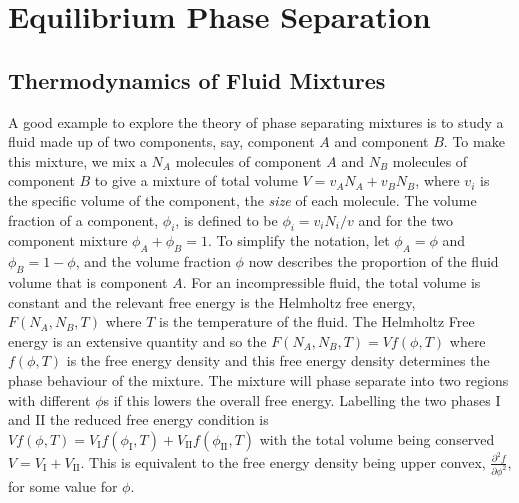\section{Equilibrium Phase Separation}

\subsection{Thermodynamics of Fluid Mixtures}

A good example to explore the theory of phase separating mixtures is to study a fluid made up of two components, say, component $A$ and component $B$. To make this mixture, we mix a $N_A$ molecules of component $A$ and $N_B$ molecules of component $B$ to give a mixture of total volume $V = v_A N_A + v_B N_B$, where $v_i$ is the specific volume of the component, the \textit{size} of each molecule. The volume fraction of a component, $\phi_i$, is defined to be $\phi_i = v_i N_i/v$ and for the two component mixture $\phi_A+\phi_B = 1$. To simplify the notation, let $\phi_A=\phi$ and $\phi_B=1-\phi$, and the volume fraction $\phi$ now describes the proportion of the fluid volume that is component $A$. For an incompressible fluid, the total volume is constant and the relevant free energy is the Helmholtz free energy, $F(N_A, N_B, T)$ where $T$ is the temperature of the fluid. The Helmholtz Free energy is an extensive quantity and so the $F(N_A, N_B, T) = V f(\phi, T)$ where $f(\phi, T)$ is the free energy density and this free energy density determines the phase behaviour of the mixture. The mixture will phase separate into two regions with different $\phi$s if this lowers the overall free energy. Labelling the two phases $\mathrm{I}$ and $\mathrm{II}$ the reduced free energy condition is $Vf(\phi, T) = V_{\mathrm{I}} f(\phi_{\mathrm{I}}, T)+ V_{\mathrm{II}} f(\phi_{\mathrm{II}}, T)$ with the total volume being conserved $V = V_{\mathrm{I}}+V_{\mathrm{II}}$. This is equivalent to the free energy density being upper convex, $\frac{\partial^2 f}{\partial \phi^2}$, for some value for $\phi$.

